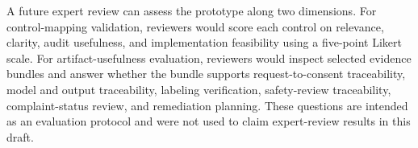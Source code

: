 \documentclass[10pt,journal]{IEEEtran}
\begin{document}
A future expert review can assess the prototype along two dimensions. For control-mapping validation, reviewers would score each control on relevance, clarity, audit usefulness, and implementation feasibility using a five-point Likert scale. For artifact-usefulness evaluation, reviewers would inspect selected evidence bundles and answer whether the bundle supports request-to-consent traceability, model and output traceability, labeling verification, safety-review traceability, complaint-status review, and remediation planning. These questions are intended as an evaluation protocol and were not used to claim expert-review results in this draft.


\FloatBarrier


\end{document}
